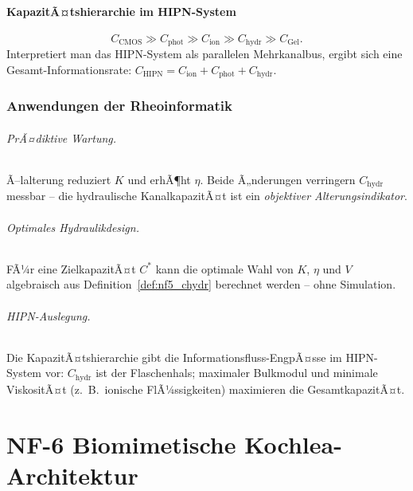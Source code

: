 ﻿\documentclass[a4paper,12pt]{scrreprt}
\theoremstyle{definition}
\begin{document}
\subsection{KapazitÃ¤tshierarchie im HIPN-System}

\[
  C_{\mathrm{CMOS}} \gg C_{\mathrm{phot}} \gg C_{\mathrm{ion}}
  \gg C_{\mathrm{hydr}} \gg C_{\mathrm{Gel}}.
\]
Interpretiert man das HIPN-System als parallelen Mehrkanalbus,
ergibt sich eine Gesamt-Informationsrate:
$C_{\mathrm{HIPN}} = C_{\mathrm{ion}} + C_{\mathrm{phot}} +
C_{\mathrm{hydr}}.$

\section{Anwendungen der Rheoinformatik}

\paragraph{PrÃ¤diktive Wartung.} Ã–lalterung reduziert $K$ und erhÃ¶ht
$\eta$. Beide Ã„nderungen verringern $C_{\mathrm{hydr}}$ messbar --
die hydraulische KanalkapazitÃ¤t ist ein \emph{objektiver
Alterungsindikator}.

\paragraph{Optimales Hydraulikdesign.} FÃ¼r eine ZielkapazitÃ¤t
$C^*$ kann die optimale Wahl von $K$, $\eta$ und $V$ algebraisch
aus Definition~\ref{def:nf5_chydr} berechnet werden -- ohne
Simulation.

\paragraph{HIPN-Auslegung.} Die KapazitÃ¤tshierarchie gibt die
Informationsfluss-EngpÃ¤sse im HIPN-System vor:
$C_{\mathrm{hydr}}$ ist der Flaschenhals; maximaler Bulkmodul
und minimale ViskositÃ¤t (z.\ B.\ ionische FlÃ¼ssigkeiten) maximieren
die GesamtkapazitÃ¤t.

\part{NF-6 \quad Biomimetische Kochlea-Architektur}
\label{part:nf6}
\end{document}
